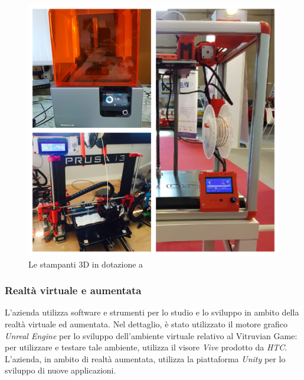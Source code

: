 \begin{figure}[H]
	\begin{center}
	\includegraphics[scale=0.07]{immagini/stampanti.jpg}
	\caption{Le stampanti 3D in dotazione a \lab{}}
	\end{center}
\end{figure}

\subsubsection{Realtà virtuale e aumentata}
L'azienda utilizza software e strumenti per lo studio e lo sviluppo in ambito della realtà virtuale ed aumentata.
Nel dettaglio, è stato utilizzato il motore grafico \textit{Unreal Engine} per lo sviluppo dell'ambiente virtuale relativo al Vitruvian Game: per utilizzare e testare tale ambiente, \lab{} utilizza il visore \textit{Vive} prodotto da \textit{HTC}.\\
L'azienda, in ambito di realtà aumentata, utilizza la piattaforma \textit{Unity} per lo sviluppo di nuove applicazioni.\\

